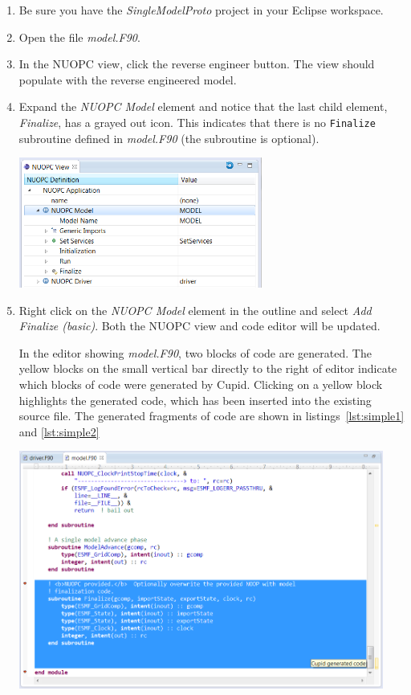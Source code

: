 \documentclass[oneside,11pt]{memoir}
\begin{document}
\begin{enumerate}

\item Be sure you have the \emph{SingleModelProto} project in your Eclipse workspace.

\item Open the file \emph{model.F90}.

\item In the NUOPC view, click the reverse engineer button.  The view should populate with the reverse engineered model.

\item Expand the \emph{NUOPC Model} element and notice that the last child element, \emph{Finalize}, has a grayed out icon.  This indicates that there is no \texttt{Finalize} subroutine defined in \emph{model.F90} (the subroutine is optional).

\parbox{\linewidth}{\centering
  \includegraphics[width=8cm]{figs/gen_fig1.png}
}

\item Right click on the \emph{NUOPC Model} element in the outline and select \emph{Add Finalize (basic)}. Both the NUOPC view and code editor will be updated.  

In the editor showing \emph{model.F90}, two blocks of code are generated.  The yellow blocks on the small vertical bar directly to the right of editor indicate which blocks of code were generated by Cupid.  Clicking on a yellow block highlights the generated code, which has been inserted into the existing source file.  The generated fragments of code are shown in listings~\ref{lst:simple1} and \ref{lst:simple2}

\parbox{\linewidth}{\centering
  \includegraphics[width=12cm]{figs/gen_fig2.png}
}



\end{enumerate}
\end{document}
